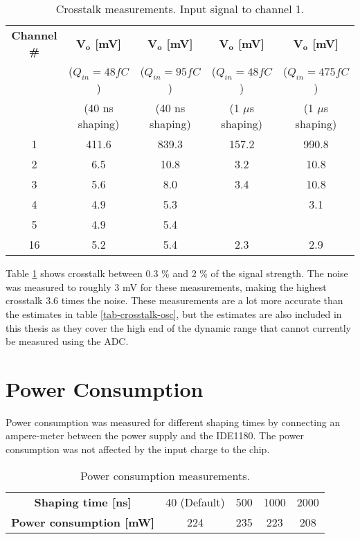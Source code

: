 \documentclass[../main/thesis.tex]{subfiles}
\begin{document}
\begin{table}[h!]
	\begin{center}
		\caption{Crosstalk measurements. Input signal to channel 1.}
		\label{tab-crosstalk-adc}
		\begin{tabular}{ccccc} \toprule
			\textbf{Channel \#} & \textbf{$\mathbf{V_o}$ [mV]} & \textbf{$\mathbf{V_o}$ [mV]} & \textbf{$\mathbf{V_o}$ [mV]} & \textbf{$\mathbf{V_o}$ [mV]} \\
			& ($Q_{in}=48 fC$) & ($Q_{in}=95 fC$) & ($Q_{in}=48 fC$)  & ($Q_{in}=475 fC$)\\ 
			& (40 ns shaping)& (40 ns shaping)& (1 $\mu$s shaping)& (1 $\mu$s shaping) \\ \midrule
			1       & 411.6  & 839.3   & 157.2 & 990.8 \\
			2       & 6.5    & 10.8    & 3.2   & 10.8  \\
			3       & 5.6    & 8.0     & 3.4   & 10.8  \\
			4       & 4.9    & 5.3     &       & 3.1   \\
			5       & 4.9    & 5.4     &       &       \\
			16      & 5.2    & 5.4     & 2.3   & 2.9 \\ \bottomrule
		\end{tabular}
	\end{center}
\end{table}

Table \ref{tab-crosstalk-adc} shows crosstalk between 0.3 \% and 2 \% of the signal strength. The noise was measured to roughly 3 mV for these measurements, making the highest crosstalk 3.6 times the noise. These measurements are a lot more accurate than the estimates in table \ref{tab-crosstalk-osc}, but the estimates are also included in this thesis as they cover the high end of the dynamic range that cannot currently be measured using the ADC. 

\section{Power Consumption}
\label{ide-power}

Power consumption was measured for different shaping times by connecting an ampere-meter between the power supply and the IDE1180. The power consumption was not affected by the input charge to the chip. 

\begin{table}[h!]
	\begin{center}
		\caption{Power consumption measurements.}
		\label{tab-ide-power}
		\begin{tabular}{ccccc}\toprule
			\textbf{Shaping time [ns]}      & 40 (Default)    & 500    & 1000    & 2000       \\ 
			\textbf{Power consumption [mW]} & 224 & 235 & 223 & 208    \\ \bottomrule
		\end{tabular}
	\end{center}
\end{table}
\end{document}
